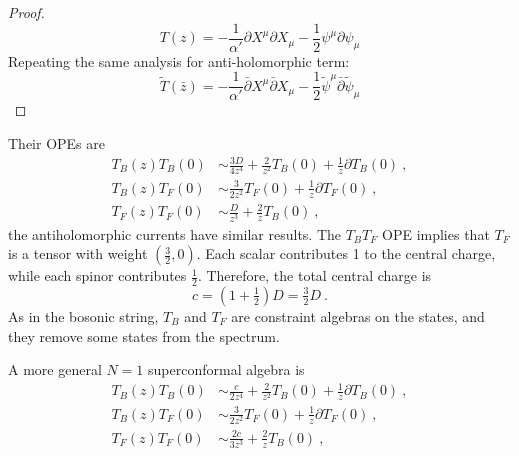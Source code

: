 \begin{tcolorbox}[breakable]
\begin{proof}
		\begin{equation}
			\boxed{
				T(z)= -\frac{1}{\alpha'}\partial X^\mu \partial X_\mu
				-\frac{1}{2}\psi^\mu \partial \psi_\mu
			}
		\end{equation}
		Repeating the same analysis for anti-holomorphic term:
		\begin{equation}
			\boxed{
				\tilde T(\bar z)= -\frac{1}{\alpha'}\bar\partial X^\mu \bar\partial X_\mu
				-\frac{1}{2}\tilde\psi^\mu \bar\partial \tilde\psi_\mu
			}
		\end{equation}
	\end{proof}
\end{tcolorbox}
Their OPEs are
\begin{subequations}
	\begin{align}
		T_{B}(z)T_{B}(0)&\sim \frac{3D}{4z^{4}}+\frac{2}{z^{2}}T_{B}(0)+\frac{1}{z}\partial T_{B}(0)\:,\label{10.1.13a}\\
		T_{B}(z)T_{F}(0)&\sim \frac{3}{2z^{2}}T_{F}(0)+\frac{1}{z}\partial T_{F}(0)\:,\label{10.1.13b}\\
		T_{F}(z)T_{F}(0)&\sim \frac{D}{z^{3}}+\frac{2}{z}T_{B}(0) \:,\label{10.1.13c}
	\end{align}
\end{subequations}
the antiholomorphic currents have similar results. The $T_{B}T_{F}$ OPE implies that $T_{F}$ is a tensor with weight $(\frac{3}{2},0)$. Each scalar contributes 1 to the central charge, while each spinor contributes $\frac{1}{2}$. Therefore, the total central charge is
\begin{equation}
	c=(1+\tfrac{1}{2})D=\tfrac{3}{2}D\:.\label{10.1.14}
\end{equation}
As in the bosonic string, $T_{B}$ and $T_{F}$ are constraint algebras on the states, and they remove some states from the spectrum.

A more general $N=1$ superconformal algebra is
\begin{subequations}
	\begin{align}
		T_{B}(z)T_{B}(0)&\sim \frac{c}{2z^{4}}+\frac{2}{z^{2}}T_{B}(0)+\frac{1}{z}\partial T_{B}(0)\:,\label{10.1.15a}\\
		T_{B}(z)T_{F}(0)&\sim \frac{3}{2z^{2}}T_{F}(0)+\frac{1}{z}\partial T_{F}(0)\:,\label{10.1.15b}\\
		T_{F}(z)T_{F}(0)&\sim \frac{2c}{3z^{3}}+\frac{2}{z}T_{B}(0) \:,\label{10.1.15c}
	\end{align}
\end{subequations}

